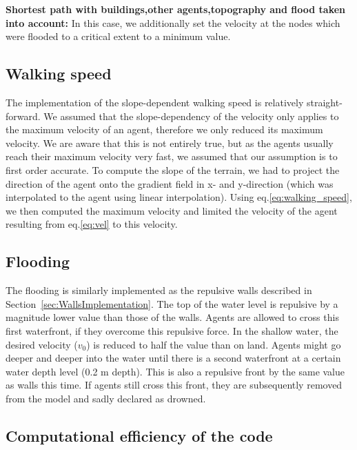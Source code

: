 \documentclass[11pt]{article}
\begin{document}
\begin{description}
\item{\textbf{Shortest path with buildings,other agents,topography and flood taken into account: }}In this case, we additionally set the velocity at the nodes which were flooded to a critical extent to a minimum value.
\end{description}

\subsection{Walking speed}
The implementation of the slope-dependent walking speed is relatively straight-forward. We assumed that the slope-dependency of the velocity only applies to the maximum velocity of an agent, therefore we only reduced its maximum velocity. We are aware that this is not entirely true, but as the agents usually reach their maximum velocity very fast, we assumed that our assumption is to first order accurate. To compute the slope of the terrain, we had to project the direction of the agent onto the gradient field in x- and y-direction (which was interpolated to the agent using linear interpolation). Using eq.\eqref{eq:walking_speed}, we then computed the maximum velocity and limited the velocity of the agent resulting from eq.\eqref{eq:vel} to this velocity.

\subsection{Flooding}

The flooding is similarly implemented as the repulsive walls described in Section~\ref{sec:WallsImplementation}. The top of the water level is repulsive by a magnitude lower value than those of the walls. Agents are allowed to cross this first waterfront, if they overcome this repulsive force. In the shallow water, the desired velocity ($v_0$) is reduced to half the value than on land. Agents might go deeper and deeper into the water until there is a second waterfront at a certain water depth level (0.2 m depth). This is also a repulsive front by the same value as walls this time. If agents still cross this front, they are subsequently removed from the model and sadly declared as drowned.

\subsection{Computational efficiency of the code}
\end{document}
